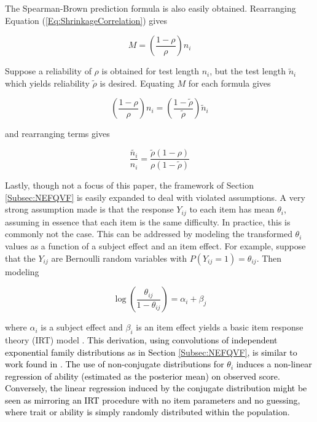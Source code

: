 \documentclass[12pt,epsfig]{article}
\newcommand{\change}[1]{\textcolor{black}{#1}}
\begin{document}
The Spearman-Brown prediction formula is also easily obtained. Rearranging Equation (\ref{Eq:ShrinkageCorrelation}) gives

\begin{equation*}
    M = \left(\dfrac{1 - \rho}{\rho}\right) n_i
\end{equation*}

\noindent Suppose a reliability of $\rho$ is obtained for test length $n_i$, but the test length $\tilde{n}_i$ which yields reliability $\tilde{\rho}$ is desired. Equating $M$  for each formula gives

\begin{equation*}
     \left(\dfrac{1 - \rho}{\rho}\right) n_i = \left(\dfrac{1 - \tilde{\rho}}{\tilde{\rho}}\right) \tilde{n}_i
\end{equation*}

\noindent and rearranging terms gives

\begin{equation*}
    \dfrac{\tilde{n_i}}{n_i} = \dfrac{\tilde{\rho}(1 - \rho)}{\rho (1 - \tilde{\rho})}
\end{equation*}

Lastly, though not a focus of this paper, the framework of Section \ref{Subsec:NEFQVF} is easily expanded to deal with violated assumptions. A very strong assumption made is that the response $Y_{ij}$ to each item has mean $\theta_i$, assuming in essence that each item is the same difficulty. In practice, this is commonly not the case. This can be addressed by modeling the transformed $\theta_i$ values as a function of a subject effect and an item effect. For example, suppose that the $Y_{ij}$ are Bernoulli random variables with $P(Y_{ij} = 1) = \theta_{ij}$. Then modeling

\begin{equation*}
    \log \left(\dfrac{\theta_{ij}}{1-\theta_{ij}}\right) = \alpha_i + \beta_j
\end{equation*}

\noindent where $\alpha_i$ is a subject effect and $\beta_i$ is an item effect yields a basic item response theory (IRT) model \citep{Gelman2007}. \change{This derivation, using convolutions of independent exponential family distributions as in Section \ref{Subsec:NEFQVF}, is similar to work found in \cite{Rasch1960}. The use of non-conjugate distributions for $\theta_i$ induces a non-linear regression of ability (estimated as the posterior mean) on observed score. Conversely, the linear regression induced by the conjugate distribution might be seen as mirroring an IRT procedure with no item parameters and no guessing, where trait or ability is simply randomly distributed within the population.}
\end{document}
